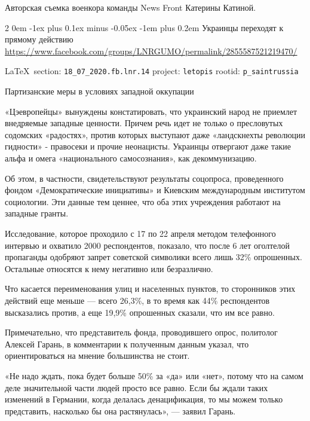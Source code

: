 \documentclass[a4paper,11pt]{extreport}
\makeatletter
\renewcommand\subsection{%
  \clearpage
    \@startsection{subsection}%
    {2}%
    {0em}%
    {-1ex plus 0.1ex minus -0.05ex}%
    {-1em plus 0.2em}%
    {\scshape\bfseries\Large}%
}
\makeatother
\begin{document}
Авторская съемка военкора команды News Front Катерины Катиной. 
 
 
\subsection{Украинцы переходят к прямому действию}
\label{sec:18_07_2020.fb.lnr.14}
\url{https://www.facebook.com/groups/LNRGUMO/permalink/2855587521219470/}
  
\vspace{0.5cm}
{\small\LaTeX~section: \verb|18_07_2020.fb.lnr.14| project: \verb|letopis| rootid: \verb|p_saintrussia|}
\vspace{0.5cm}
  
Партизанские меры в условиях западной оккупации

«Цэевропейцы» вынуждены констатировать, что украинский народ не приемлет
внедряемые западные ценности. Причем речь идет не только о пресловутых
содомских «радостях», против которых выступают даже «ландскнехты революции
гидности» - правосеки и прочие неонацисты. Украинцы отвергают даже такие альфа
и омега «национального самосознания», как декоммунизацию.

Об этом, в частности, свидетельствуют результаты соцопроса, проведенного фондом
«Демократические инициативы» и Киевским международным институтом социологии.
Эти данные тем ценнее, что оба этих учреждения работают на западные гранты.

Исследование, которое проходило с 17 по 22 апреля методом телефонного интервью
и охватило 2000 респондентов, показало, что после 6 лет оголтелой пропаганды
одобряют запрет советской символики всего лишь 32\% опрошенных. Остальные
относятся к нему негативно или безразлично.

Что касается переименования улиц и населенных пунктов, то сторонников этих
действий еще меньше --- всего 26,3\%, в то время как 44\% респондентов
высказались против, а еще 19,9\% опрошенных сказали, что им все равно.

Примечательно, что представитель фонда, проводившего опрос, политолог Алексей
Гарань, в комментарии к полученным данным указал, что ориентироваться на мнение
большинства не стоит.

«Не надо ждать, пока будет больше 50\% за «да» или «нет», потому что на самом
деле значительной части людей просто все равно. Если бы ждали таких изменений в
Германии, когда делалась денацификация, то мы можем только представить,
насколько бы она растянулась», --- заявил Гарань.
\end{document}
